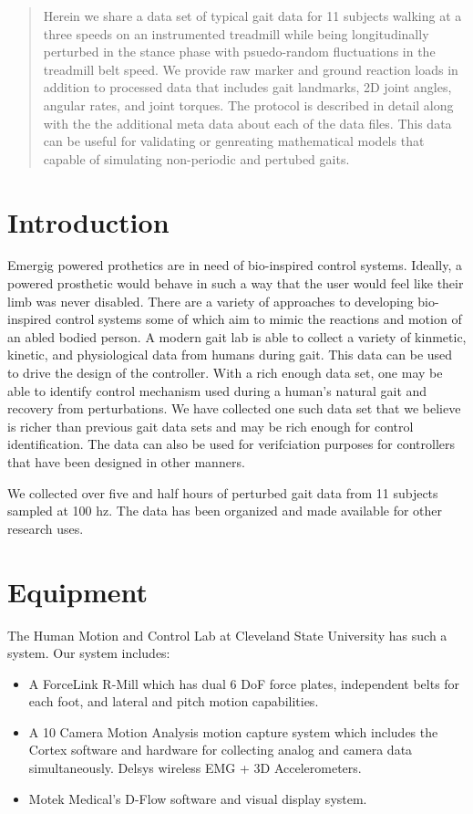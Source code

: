 \documentclass{article}
\begin{document}
\begin{abstract}

  Herein we share a data set of typical gait data for 11 subjects walking at a
  three speeds on an instrumented treadmill while being longitudinally
  perturbed in the stance phase with psuedo-random fluctuations in the
  treadmill belt speed. We provide raw marker and ground reaction loads in
  addition to processed data that includes gait landmarks, 2D joint angles,
  angular rates, and joint torques. The protocol is described in detail along
  with the the additional meta data about each of the data files. This data can
  be useful for validating or genreating mathematical models that capable of
  simulating non-periodic and pertubed gaits.

\end{abstract}

\section{Introduction}
%
Emergig powered prothetics are in need of bio-inspired control systems.
Ideally, a powered prosthetic would behave in such a way that the user would
feel like their limb was never disabled. There are a variety of approaches to
developing bio-inspired control systems some of which aim to mimic the
reactions and motion of an abled bodied person. A modern gait lab is able to
collect a variety of kinmetic, kinetic, and physiological data from humans
during gait. This data can be used to drive the design of the controller. With
a rich enough data set, one may be able to identify control mechanism used
during a human's natural gait and recovery from perturbations. We have
collected one such data set that we believe is richer than previous gait data
sets and may be rich enough for control identification. The data can also be
used for verifciation purposes for controllers that have been designed in other
manners.

We collected over five and half hours of perturbed gait data from 11 subjects
sampled at 100 hz. The data has been organized and made available for other
research uses.

\section{Equipment}
%
The Human Motion and Control Lab at Cleveland State University has such a
system. Our system includes:

\begin{itemize}
  \item A ForceLink R-Mill which has dual 6 DoF force plates, independent belts
    for each foot, and lateral and pitch motion capabilities.
  \item A 10 Camera Motion Analysis motion capture system which includes the
    Cortex software and hardware for collecting analog and camera data
    simultaneously.  Delsys wireless EMG + 3D Accelerometers.
  \item Motek Medical’s D-Flow software and visual display system.
\end{itemize}
\end{document}

